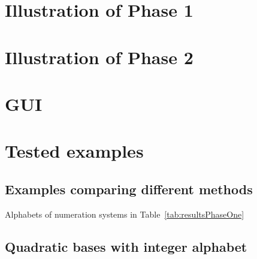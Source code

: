 \section{Illustration of Phase 1}
\section{Illustration of Phase 2}

\section{GUI}
\section{Tested examples}

\subsection*{Examples comparing different methods}

\begin{table}[h]
	\begin{center}
	
	\end{center}
\caption{Alphabets of numeration systems in Table~\ref{tab:resultsPhaseOne}}
\label{tab:alphabets}
\end{table}




%
%
\subsection*{Quadratic bases with integer alphabet}


%